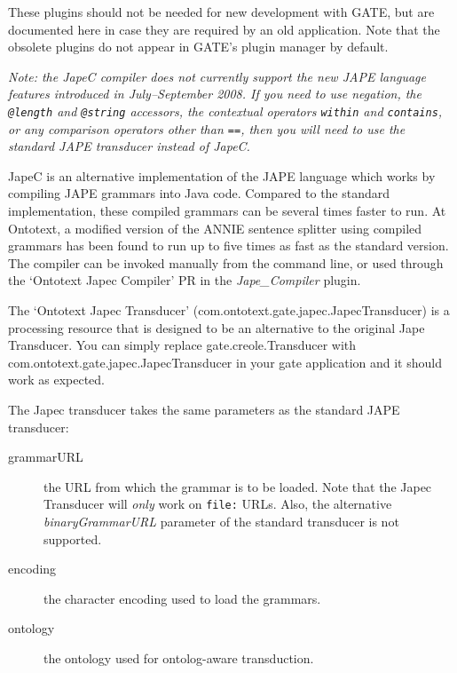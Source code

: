 
These plugins should not be needed for new development with GATE, but are documented here
in case they are required by an old application.  Note that the obsolete plugins do not
appear in GATE's plugin manager by default.




\textit{Note: the JapeC compiler does not currently support the new JAPE
language features introduced in July--September 2008.  If you need to use
negation, the \texttt{@length} and \texttt{@string} accessors, the contextual
operators \texttt{within} and \texttt{contains}, or any comparison operators
other than \texttt{==}, then you will need to use the standard JAPE
transducer instead of JapeC.}

JapeC is an alternative implementation of the JAPE language which works by
compiling JAPE grammars into Java code.  Compared to the standard
implementation, these compiled grammars can be several times faster to run.  At
Ontotext, a modified version of the ANNIE sentence splitter using compiled
grammars has been found to run up to five times as fast as the standard
version.  The compiler can be invoked manually from the command line, or used
through the `Ontotext Japec Compiler' PR in the {\it Jape\_Compiler} plugin.

The `Ontotext Japec Transducer' (com.ontotext.gate.japec.JapecTransducer) is
a processing resource that is designed to be an alternative to the original
Jape Transducer. You can simply replace gate.creole.Transducer with
com.ontotext.gate.japec.JapecTransducer in your gate application and it should
work as expected.

The Japec transducer takes the same parameters as the standard JAPE transducer:
\begin{description}
\item[grammarURL] the URL from which the grammar is to be loaded.  Note that
the Japec Transducer will {\it only} work on {\tt file:} URLs.  Also, the
alternative {\it binaryGrammarURL} parameter of the standard transducer is not
supported.
\item[encoding] the character encoding used to load the grammars.
\item[ontology] the ontology used for ontolog-aware transduction.
\end{description}

